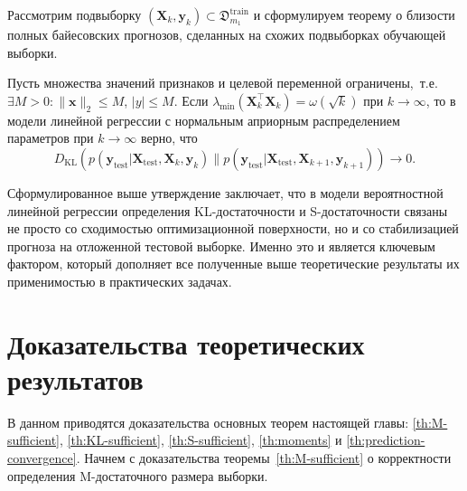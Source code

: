 Рассмотрим подвыборку $(\mathbf{X}_k, \mathbf{y}_k) \subset \mathfrak{D}_{m_1}^{\text{train}}$ и сформулируем теорему о близости полных байесовских прогнозов, сделанных на схожих подвыборках обучающей выборки.

\begin{theorem}\label{th:prediction-convergence}
    Пусть множества значений признаков и целевой переменной ограничены,~т.\:е. $\exists M > 0: \|\mathbf{x}\|_2 \leqslant M$, $|y| \leqslant M$. Если $\lambda_{\min}(\mathbf{X}_k^\top \mathbf{X}_k) = \omega(\sqrt{k})$ при $k \to \infty$, то в модели линейной регрессии с нормальным априорным распределением параметров при $k \to \infty$ верно, что
    \begin{equation}
        \label{eq:prediction-convergence}
        D_{\mathrm{KL}}\left(p(\mathbf{y}_{\mathrm{test}}|\mathbf{X}_{\mathrm{test}}, \mathbf{X}_k, \mathbf{y}_k) \| p(\mathbf{y}_{\mathrm{test}}|\mathbf{X}_{\mathrm{test}}, \mathbf{X}_{k+1}, \mathbf{y}_{k+1})\right) \to 0.
    \end{equation}
\end{theorem}

Сформулированное выше утверждение заключает, что в модели вероятностной линейной регрессии определения KL-достаточности и S-достаточности связаны не просто со сходимостью оптимизационной поверхности, но и со стабилизацией прогноза на отложенной тестовой выборке. Именно это и является ключевым фактором, который дополняет все полученные выше теоретические результаты их применимостью в практических задачах.

\section{Доказательства теоретических результатов}

В данном приводятся доказательства основных теорем настоящей главы: \ref{th:M-sufficient}, \ref{th:KL-sufficient}, \ref{th:S-sufficient}, \ref{th:moments} и \ref{th:prediction-convergence}. Начнем с доказательства теоремы~\ref{th:M-sufficient} о корректности определения M-достаточного размера выборки.

